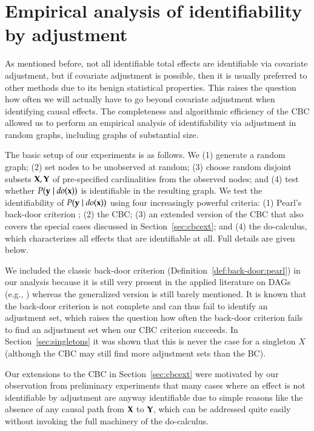 \section{Empirical analysis of identifiability by adjustment}\label{sec:experiments}

As mentioned before, not all identifiable total effects are identifiable via covariate adjustment, but 
if covariate adjustment is possible, then it is usually preferred to other methods due to its benign statistical properties. This raises the question how often we will actually have to go beyond covariate adjustment when identifying causal effects. The completeness and algorithmic efficiency of the CBC allowed us to perform an empirical analysis of identifiability via adjustment in random graphs, including graphs of substantial size. 
%

The basic setup of our experiments is as follows. We (1) generate a random graph; (2) set nodes to be unobserved at random; 
(3) choose random disjoint subsets ${\bf X},{\bf Y}$  of pre-specified cardinalities from the observed nodes; and (4) test whether $P({\bf y} \mid \textit{do}({\bf x}))$ is identifiable in the resulting graph. We test the identifiability of  $P({\bf y} \mid \textit{do}({\bf x}))$ using four increasingly powerful criteria: (1) Pearl's back-door criterion  \cite{Pearl2009}; (2) the CBC; (3) an extended version of the CBC that also covers the special cases discussed in Section~\ref{sec:cbcext}; and (4) the do-calculus, which characterizes all effects that are identifiable at all. Full details are given below.

We included the classic back-door criterion (Definition~\ref{def:back-door:pearl}) in our analysis because it is still very present in the applied literature on DAGs (e.g., \cite{Elwert2013}) whereas the generalized version is still barely mentioned. It is known that the back-door criterion is not complete and can thus fail to identify an adjustment set, which raises the question how often the back-door criterion fails to find an adjustment set when our CBC criterion succeeds. In Section~\ref{sec:singletons} it was shown that this is never the case for a singleton $X$ (although the CBC may still find more adjustment sets than the BC).

Our extensions to the CBC in Section~\ref{sec:cbcext} were motivated by our observation from preliminary experiments that many cases where an effect is not identifiable by adjustment are anyway identifiable due to simple reasons like the absence of any causal path from ${\bf X}$ to ${\bf Y}$, which can be addressed quite easily without invoking the full machinery of the do-calculus.

